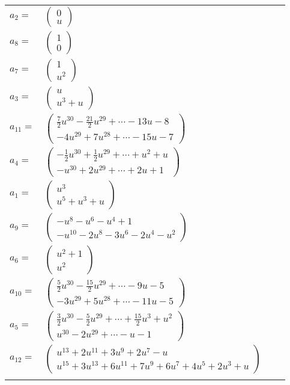 \documentclass[1p]{elsarticle_modified}
\theoremstyle{definition}
\begin{document}
\begin{tabular}{m{7pt} m{180pt} m{7pt} m{180pt} }
\flushright $a_{2}=$&$\begin{pmatrix}0\\u\end{pmatrix}$ \\
\flushright $a_{8}=$&$\begin{pmatrix}1\\0\end{pmatrix}$ \\
\flushright $a_{7}=$&$\begin{pmatrix}1\\u^2\end{pmatrix}$ \\
\flushright $a_{3}=$&$\begin{pmatrix}u\\u^3+u\end{pmatrix}$ \\
\flushright $a_{11}=$&$\begin{pmatrix}\frac{7}{2} u^{30}-\frac{21}{2} u^{29}+\cdots-13 u-8\\-4 u^{29}+7 u^{28}+\cdots-15 u-7\end{pmatrix}$ \\
\flushright $a_{4}=$&$\begin{pmatrix}-\frac{1}{2} u^{30}+\frac{1}{2} u^{29}+\cdots+u^2+u\\- u^{30}+2 u^{29}+\cdots+2 u+1\end{pmatrix}$ \\
\flushright $a_{1}=$&$\begin{pmatrix}u^3\\u^5+u^3+u\end{pmatrix}$ \\
\flushright $a_{9}=$&$\begin{pmatrix}- u^8- u^6- u^4+1\\- u^{10}-2 u^8-3 u^6-2 u^4- u^2\end{pmatrix}$ \\
\flushright $a_{6}=$&$\begin{pmatrix}u^2+1\\u^2\end{pmatrix}$ \\
\flushright $a_{10}=$&$\begin{pmatrix}\frac{5}{2} u^{30}-\frac{15}{2} u^{29}+\cdots-9 u-5\\-3 u^{29}+5 u^{28}+\cdots-11 u-5\end{pmatrix}$ \\
\flushright $a_{5}=$&$\begin{pmatrix}\frac{3}{2} u^{30}-\frac{5}{2} u^{29}+\cdots+\frac{15}{2} u^3+u^2\\u^{30}-2 u^{29}+\cdots- u-1\end{pmatrix}$ \\
\flushright $a_{12}=$&$\begin{pmatrix}u^{13}+2 u^{11}+3 u^9+2 u^7- u\\u^{15}+3 u^{13}+6 u^{11}+7 u^9+6 u^7+4 u^5+2 u^3+u\end{pmatrix}$\\&\end{tabular}
\end{document}
